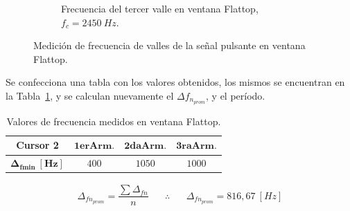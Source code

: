 \begin{figure}[H]
        \hfill
        \begin{subfigure}[H]{0.48\textwidth}
          \caption{Frecuencia del tercer valle en ventana Flattop, $f_{c}=2450~Hz$.}
        \end{subfigure}

        \caption{Medición de frecuencia de valles de la señal pulsante en ventana Flattop.}
        \label{fig:Exp2SeñalPulsanteVallesEspectro}
      \end{figure}     

      Se confecciona una tabla con los valores obtenidos, los mismos se encuentran en la 
      Tabla~\ref{tab:Exp2MedicionesFlattop}, y se calculan nuevamente el $\Delta f_{n_{prom}}$, 
      y el período. 

      \begin{table}[H]
      \centering
        \begin{tabular}{cccc} \hline \hline
          \textbf{Cursor 2}               &  $\mathbf{1erArm.}$       & $\mathbf{2daArm.}$        & $\mathbf{3raArm.}$   \\ \hline
          $\mathbf{\Delta_{fmin}~[Hz]}$       &   $400$                        &    $1050$                    &   $1000$  \\ \hline \hline
         \end{tabular}
          \caption{Valores de frecuencia medidos en ventana Flattop.}
          \label{tab:Exp2MedicionesFlattop}
      \end{table}  

      \begin{align*}
        \Delta_{fn_{prom}}=\dfrac{\sum{\Delta_{fn}}}{n} \hspace{20pt} \therefore \hspace{20pt} \boxed{\Delta_{fn_{prom}}=816,67~[Hz]}
      \end{align*}        

